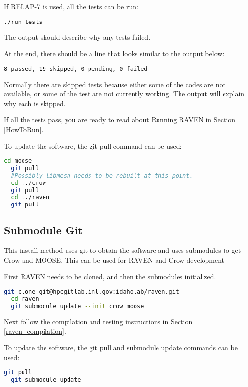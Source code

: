 If RELAP-7 is used, all the tests can be run:

\begin{lstlisting}[language=bash]
  ./run_tests
\end{lstlisting}


The output should describe why any tests failed.

At the end, there should be a line that looks similar to the output below:
\begin{lstlisting}[language=bash]
8 passed, 19 skipped, 0 pending, 0 failed
\end{lstlisting}

Normally there are skipped tests because either some of the codes are
not available, or some of the test are not currently working.  The
output will explain why each is skipped.

If all the tests pass, you are ready to read about Running RAVEN in
Section \ref{HowToRun}.

To update the software, the git pull command can be used:

\begin{lstlisting}[language=bash]
  cd moose
  git pull
  #Possibly libmesh needs to be rebuilt at this point.
  cd ../crow
  git pull
  cd ../raven
  git pull
\end{lstlisting}

\subsection{Submodule Git}
\label{submodule_git}

This install method uses git to obtain the software and uses
submodules to get Crow and MOOSE.  This can be used for RAVEN and Crow
development.

First RAVEN needs to be cloned, and then the submodules initialized.

\begin{lstlisting}[language=bash]
  git clone git@hpcgitlab.inl.gov:idaholab/raven.git
  cd raven
  git submodule update --init crow moose
\end{lstlisting}

Next follow the compilation and testing instructions in Section \ref{raven_compilation}.

To update the software, the git pull and submodule update commands can
be used:

\begin{lstlisting}[language=bash]
  git pull
  git submodule update
\end{lstlisting}


